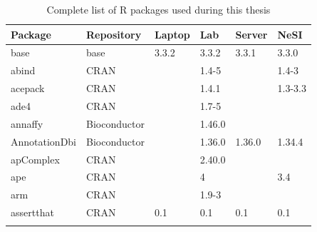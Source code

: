 \begin{longtable}{llllll}
\caption{Complete list of R packages used during this thesis}
\label{tab:computers_r_packages_full}
\\
\multicolumn{1}{l}{\bfseries Package}  & \multicolumn{1}{l}{\bfseries Repository}  & \multicolumn{1}{l}{\bfseries Laptop}      & \multicolumn{1}{l}{\bfseries Lab}         & \multicolumn{1}{l}{\bfseries Server}         & \multicolumn{1}{l}{\bfseries NeSI} \\ \hline \rowcolor{black!10}
base                          & base                      & 3.3.2       & 3.3.2       & 3.3.1          & 3.3.0             \\
\rowcolor{black!5}
abind                         & \acrshort{CRAN}                      &             & 1.4-5       &                & 1.4-3              \\
\rowcolor{black!10}
acepack                       & \acrshort{CRAN}                      &             & 1.4.1       &                & 1.3-3.3           \\
\rowcolor{black!5}
ade4                          & \acrshort{CRAN}                      &             & 1.7-5       &                &                    \\
\rowcolor{black!10}
annaffy                       & Bioconductor              &             & 1.46.0      &                &                   \\
\rowcolor{black!5}
AnnotationDbi                 & Bioconductor              &             & 1.36.0      & 1.36.0         & 1.34.4             \\
\rowcolor{black!10}
apComplex                     & \acrshort{CRAN}                      &             & 2.40.0      &                &                   \\
\rowcolor{black!5}
ape                           & \acrshort{CRAN}                      &             & 4           &                & 3.4                \\
\rowcolor{black!10}
arm                           & \acrshort{CRAN}                      &             & 1.9-3       &                &                   \\
\rowcolor{black!5}
assertthat                    & \acrshort{CRAN}                      & 0.1         & 0.1         & 0.1            & 0.1                \\
\rowcolor{black!10}

\end{longtable}
